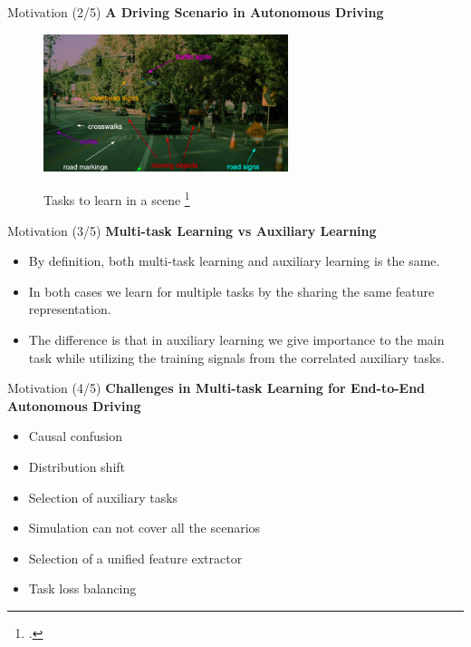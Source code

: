 \documentclass[aspectratio=169]{beamer}
\begin{document}
\begin{frame}{Motivation (2/5)}
  \textbf{A Driving Scenario in Autonomous Driving}
  \begin{figure}[H]
     \centering
     
\includegraphics[width=0.6\linewidth, height=4cm]{images/MTL_aux.png} 
\label{fig:subim1}

\caption{Tasks to learn in a scene \footcite{tesla} }
\label{fig:image2}
\end{figure}
\end{frame}

\begin{frame}{Motivation (3/5)}
  \textbf{Multi-task Learning vs Auxiliary Learning}

  \begin{itemize}
      \item By definition, both multi-task learning and auxiliary learning is the same. 
      \item In both cases we learn for multiple tasks by the sharing the same feature representation.
      \item The difference is that in auxiliary learning we give importance to the main task while utilizing the training signals from the correlated auxiliary tasks. 
  \end{itemize}
   
\end{frame}


   
\begin{frame}{Motivation (4/5)}
  \textbf{Challenges in Multi-task Learning for End-to-End Autonomous Driving
}

  \begin{itemize}
      \item Causal confusion
      \item Distribution shift 
      \item Selection of auxiliary tasks
      \item Simulation can not cover all the scenarios 
      \item Selection of a unified feature extractor 
      \item Task loss balancing
  \end{itemize}
\end{frame}
\end{document}
